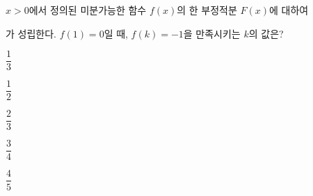 $x>0$에서 정의된 미분가능한 함수 $f(x)$의 한 부정적분 $F(x)$에 대하여 \par\smallskip{}\par\smallskip\noindent 가 성립한다. $f(1)=0$일 때, $f(k)=-1$을 만족시키는 $k$의 값은?
\begin{choices32}{\rule[-3ex]{0pt}{8ex}$\dfrac{1}{3}$}{\rule[-3ex]{0pt}{8ex}$\dfrac{1}{2}$}{\rule[-3ex]{0pt}{8ex}$\dfrac{2}{3}$}{\rule[-3ex]{0pt}{8ex}$\dfrac{3}{4}$}{\rule[-3ex]{0pt}{8ex}$\dfrac{4}{5}$}\end{choices32}
